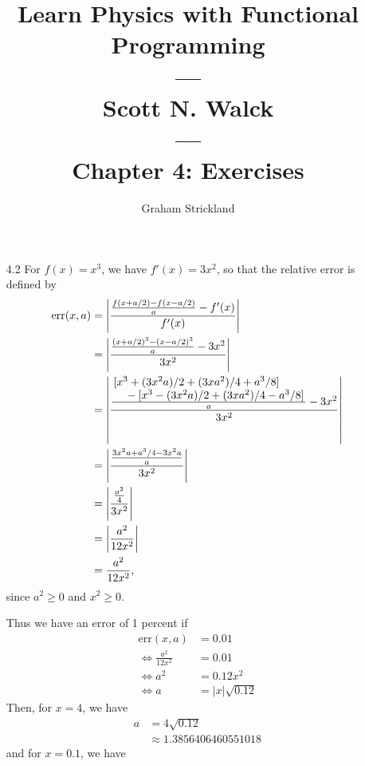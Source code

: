 \documentclass{article}
\title{Learn Physics with Functional Programming\\---\\Scott N. Walck\\---\\Chapter 4: Exercises}
\author{Graham Strickland}
\begin{document}
\maketitle  

\begin{itemize}
    \item[4.2]
    For $f(x) = x^3$, we have $f'(x) = 3x^2$, so that the relative error is defined by
    \begin{equation*}
        \begin{split}
            \text{err}(x, a) &= \left| \frac{\frac{f(x + a/2) - f(x - a/2)}{a} - f'(x)}{f'(x)} \right| \\
            &= \left| \frac{\frac{(x + a/2)^3 - (x - a/2)^3}{a} - 3x^2}{3x^2} \right| \\
            &= \left| \frac{\frac{\splitfrac{[x^3 + (3x^2a)/2 + (3xa^2)/4 + a^3/8]}
                {{} - [x^3 - (3x^2a)/2 + (3xa^2)/4 - a^3/8]}}{a} - 3x^2}{3x^2} \right| \\
            &= \left| \frac{\frac{3x^2a + a^3/4 - 3x^2a}{a}}{3x^2} \right| \\
            &= \left| \frac{\frac{a^2}{4}}{3x^2} \right| \\
            &= \left| \frac{a^2}{12x^2} \right| \\
            &= \frac{a^2}{12x^2},
        \end{split}
    \end{equation*}
    since $a^2 \geq 0$ and $x^2 \geq 0$.\par
    \qquad Thus we have an error of 1 percent if 
    \begin{equation*}
        \begin{split}
            \text{err}(x, a) &= 0.01 \\
            \Leftrightarrow \frac{a^2}{12x^2} &= 0.01 \\
            \Leftrightarrow a^2 &= 0.12x^2 \\
            \Leftrightarrow a &= |x|\sqrt{0.12}
        \end{split}
    \end{equation*}
    \qquad Then, for $x = 4$, we have
    \begin{equation*}
        \begin{split}
            a &= 4\sqrt{0.12} \\
            &\approx 1.3856406460551018
        \end{split}
    \end{equation*}
    and for $x = 0.1$, we have

\end{itemize}
\end{document}
